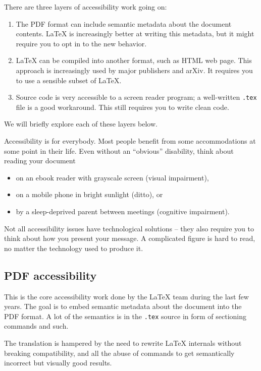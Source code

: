 There are three layers of accessibility work going on:
%
\begin{enumerate}
\item The PDF format can include semantic metadata about the document contents.
    \LaTeX{} is increasingly better at writing this metadata,
    but it might require you to opt in to the new behavior.
\item \LaTeX{} can be compiled into another format, such as HTML web page.
    This approach is increasingly used by major publishers and arXiv.
    It requires you to use a sensible subset of \LaTeX.
\item Source code is very accessible to a screen reader program;
    a well-written \verb|.tex| file is a good workaround.
    This still requires you to write clean code.
\end{enumerate}
%
We will briefly explore each of these layers below.

\begin{practices}
Accessibility is for everybody.
Most people benefit from some accommodations at some point in their life.
Even without an ``obvious'' disability, think about reading your document
\begin{itemize}
    \item on an ebook reader with grayscale screen (visual impairment),
    \item on a mobile phone in bright sunlight (ditto), or
    \item by a sleep-deprived parent between meetings (cognitive impairment).
\end{itemize}
Not all accessibility issues have technological solutions
-- they also require you to think about how you present your message.
A complicated figure is hard to read, no matter the technology used to produce it.
\end{practices}


%
%
\subsection{PDF accessibility}

This is the core accessibility work done by the \LaTeX{} team during the last few years.
The goal is to embed semantic metadata about the document into the PDF format.
A lot of the semantics is in the \verb|.tex| source in form of sectioning commands and such.

The translation is hampered by the need to rewrite \LaTeX{} internals without breaking compatibility,
and all the abuse of commands to get semantically incorrect but visually good results.


